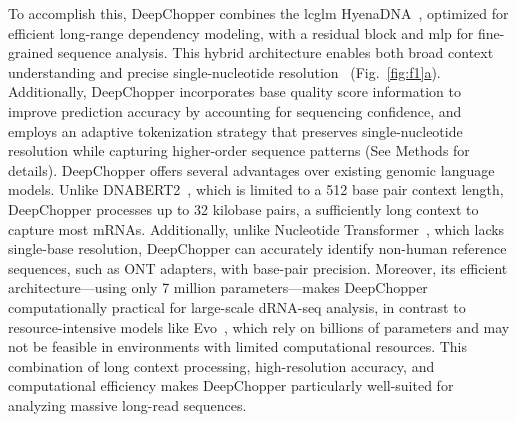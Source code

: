 \documentclass[pdflatex,sn-nature, lineno]{sn-jnl}%
\newcommand{\figref}[2]{Fig.~\hyperref[#1]{\ref*{#1}#2}}
\theoremstyle{thmstyleone}%
\theoremstyle{thmstyletwo}%
\theoremstyle{thmstylethree}%
\begin{document}
To accomplish this, DeepChopper combines the \gls{lcglm} HyenaDNA~\cite{nguyen2024hyenadna}, optimized for efficient long-range dependency modeling, with a residual block and \gls{mlp} for fine-grained sequence analysis. This hybrid architecture enables both broad context understanding and precise single-nucleotide resolution~\cite{poli2023hyena, he2016deep} (\figref{fig:f1}{a}). Additionally, DeepChopper incorporates base quality score information to improve prediction accuracy by accounting for sequencing confidence, and employs an adaptive tokenization strategy that preserves single-nucleotide resolution while capturing higher-order sequence patterns (See Methods for details). DeepChopper offers several advantages over existing genomic language models. Unlike DNABERT2~\cite{zhou2023dnabert2}, which is limited to a 512 base pair context length, DeepChopper processes up to 32 kilobase pairs, a sufficiently long context to capture most mRNAs. Additionally, unlike Nucleotide Transformer~\cite{dalla2023nucleotide}, which lacks single-base resolution, DeepChopper can accurately identify non-human reference sequences, such as ONT adapters, with base-pair precision. Moreover, its efficient architecture—using only 7 million parameters—makes DeepChopper computationally practical for large-scale dRNA-seq analysis, in contrast to resource-intensive models like Evo~\cite{nguyen2024sequence}, which rely on billions of parameters and may not be feasible in environments with limited computational resources. This combination of long context processing, high-resolution accuracy, and computational efficiency makes DeepChopper particularly well-suited for analyzing massive long-read sequences.
\end{document}
